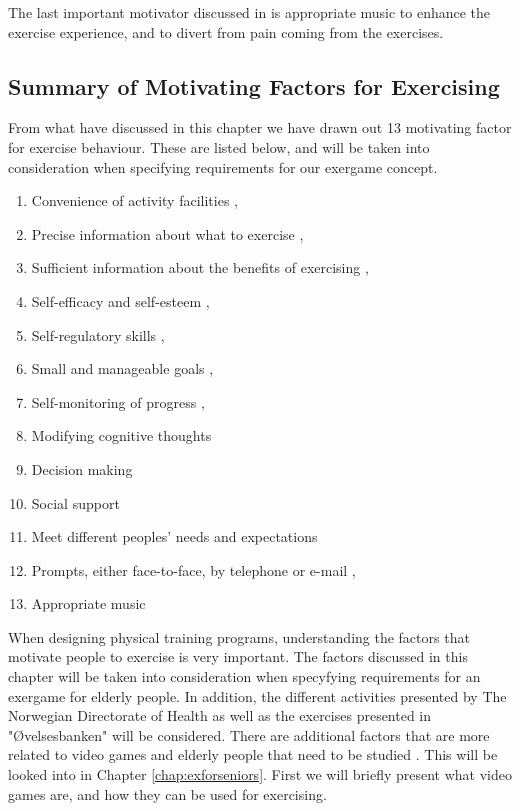 The last important motivator discussed in \cite{schutzer} is appropriate music to enhance the exercise experience, and to divert from pain coming from the exercises. 


\subsection{Summary of Motivating Factors for Exercising}
\label{subsec:motivator}

From what have discussed in this chapter we have drawn out 13 motivating factor for exercise behaviour. These are listed below, and will be taken into consideration when specifying requirements for our exergame concept. 

\begin{enumerate}[{m}.1]
\item Convenience of activity facilities \cite{chao}, \cite{schutzer}
\item Precise information about what to exercise \cite{chao}, \cite{schutzer}
\item Sufficient information about the benefits of exercising \cite{chao}, \cite{schutzer}
\item Self-efficacy and self-esteem \cite{schutzer}, \cite{white}
\item Self-regulatory skills \cite{chao}, \cite{schutzer}
\item Small and manageable goals \cite{chao},\cite{schutzer}
\item Self-monitoring of progress \cite{chao},\cite{schutzer}
\item Modifying cognitive thoughts \cite{chao}
\item Decision making \cite{chao}
\item Social support \cite{chao}
\item Meet different peoples' needs and expectations \cite{chao}
\item Prompts, either face-to-face, by telephone or e-mail \cite{chao},\cite{schutzer}
\item Appropriate music \cite{schutzer}
\end{enumerate} 

\bigskip

When designing physical training programs, understanding the factors that motivate people to exercise is very important. The factors discussed in this chapter will be taken into consideration when specyfying requirements for an exergame for elderly people. In addition, the different activities presented by The Norwegian Directorate of Health as well as the exercises presented in "Øvelsesbanken" will be considered. There are additional factors that are more related to video games and elderly people that need to be studied . This will be looked into in Chapter \ref{chap:exforseniors}. First we will briefly present what video games are, and how they can be used for exercising. 




